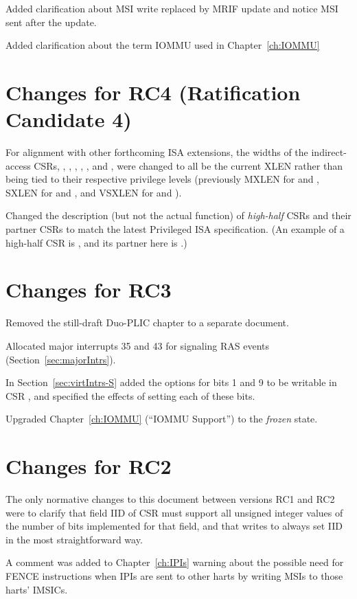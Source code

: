Added clarification about MSI write replaced by MRIF update and
notice MSI sent after the update.

Added clarification about the term \mbox{IOMMU} used in Chapter~\ref{ch:IOMMU}

\section*{Changes for RC4 (Ratification Candidate 4)}

For alignment with other forthcoming {\RISCV} ISA extensions,
the widths of the indirect-access CSRs, , ,
, , , and , were
changed to all be the current XLEN rather than being tied to
their respective privilege levels (previously MXLEN for
 and , SXLEN for  and ,
and VSXLEN for  and ).

Changed the description (but not the actual function)
of \emph{high-half} CSRs and their partner CSRs
to match the latest {\RISCV} Privileged ISA specification.
(An example of a high-half CSR is ,
and its partner here is .)

\section*{Changes for RC3}

Removed the still-draft Duo-PLIC chapter to a separate document.

Allocated major interrupts 35 and 43 for signaling RAS events
(Section~\ref{sec:majorIntrs}).

In Section~\ref{sec:virtIntrs-S} added the options
for bits 1 and 9 to be writable in CSR ,
and specified the effects of setting each of these bits.

Upgraded Chapter~\ref{ch:IOMMU} (``IOMMU Support'')
to the \emph{frozen} state.

\section*{Changes for RC2}

The only normative changes to this document
between versions RC1 and RC2 were to clarify that
field IID of CSR  must support all
unsigned integer values of the number of bits implemented
for that field, and that writes to 
always set IID in the most straightforward way.

A comment was added to Chapter~\ref{ch:IPIs} warning about
the possible need for FENCE instructions when IPIs are
sent to other harts by writing MSIs to those harts' IMSICs.

